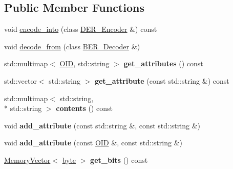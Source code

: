 \subsection*{Public Member Functions}
\begin{DoxyCompactItemize}
\item 
void \hyperlink{classBotan_1_1X509__DN_a66ceab0b7e473e2d7ca4bdb57393de4b}{encode\-\_\-into} (class \hyperlink{classBotan_1_1DER__Encoder}{D\-E\-R\-\_\-\-Encoder} \&) const 
\item 
void \hyperlink{classBotan_1_1X509__DN_a1a3375d4df30c8e7610262f7906715a3}{decode\-\_\-from} (class \hyperlink{classBotan_1_1BER__Decoder}{B\-E\-R\-\_\-\-Decoder} \&)
\item 
\hypertarget{classBotan_1_1X509__DN_a45f24296e5c2539f191e31b240d67e8c}{std\-::multimap$<$ \hyperlink{classBotan_1_1OID}{O\-I\-D}, std\-::string $>$ {\bfseries get\-\_\-attributes} () const }\label{classBotan_1_1X509__DN_a45f24296e5c2539f191e31b240d67e8c}

\item 
\hypertarget{classBotan_1_1X509__DN_a58a2a4810292127f0789f34653237013}{std\-::vector$<$ std\-::string $>$ {\bfseries get\-\_\-attribute} (const std\-::string \&) const }\label{classBotan_1_1X509__DN_a58a2a4810292127f0789f34653237013}

\item 
\hypertarget{classBotan_1_1X509__DN_aa02a01747b4bd5e7ef26e3d9bd172f25}{std\-::multimap$<$ std\-::string, \\*
std\-::string $>$ {\bfseries contents} () const }\label{classBotan_1_1X509__DN_aa02a01747b4bd5e7ef26e3d9bd172f25}

\item 
\hypertarget{classBotan_1_1X509__DN_a59865e97535579fdfeab5c5039065139}{void {\bfseries add\-\_\-attribute} (const std\-::string \&, const std\-::string \&)}\label{classBotan_1_1X509__DN_a59865e97535579fdfeab5c5039065139}

\item 
\hypertarget{classBotan_1_1X509__DN_a6de68079f9cd34ca5b36cf0b874f383e}{void {\bfseries add\-\_\-attribute} (const \hyperlink{classBotan_1_1OID}{O\-I\-D} \&, const std\-::string \&)}\label{classBotan_1_1X509__DN_a6de68079f9cd34ca5b36cf0b874f383e}

\item 
\hypertarget{classBotan_1_1X509__DN_a9e2d96c2219b4b38f479709a1174a6a1}{\hyperlink{classBotan_1_1MemoryVector}{Memory\-Vector}$<$ \hyperlink{namespaceBotan_a7d793989d801281df48c6b19616b8b84}{byte} $>$ {\bfseries get\-\_\-bits} () const }\label{classBotan_1_1X509__DN_a9e2d96c2219b4b38f479709a1174a6a1}


\end{DoxyCompactItemize}
